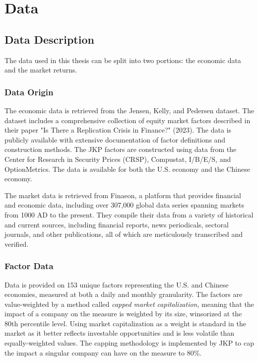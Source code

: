 \chapter{Data}

\section{Data Description}

The data used in this thesis can be split into two portions: the economic data and the market returns.

\subsection{Data Origin}

The economic data is retrieved from the Jensen, Kelly, and Pedersen dataset. The dataset includes a comprehensive collection of equity market factors described in their paper "Is There a Replication Crisis in Finance?" (2023). The data is publicly available with extensive documentation of factor definitions and construction methods. The JKP factors are constructed using data from the Center for Research in Security Prices (CRSP), Compustat, I/B/E/S, and OptionMetrics. The data is available for both the U.S. economy and the Chinese economy.

The market data is retrieved from Finaeon, a platform that provides financial and economic data, including over 307,000 global data series spanning markets from 1000 AD to the present. They compile their data from a variety of historical and current sources, including financial reports, news periodicals, sectoral journals, and other publications, all of which are meticulously transcribed and verified.

\subsection{Factor Data}

Data is provided on 153 unique factors representing the U.S. and Chinese economies, measured at both a daily and monthly granularity. The factors are value-weighted by a method called \textit{capped market capitalization}, meaning that the impact of a company on the measure is weighted by its size, winsorized at the 80th percentile level. Using market capitalization as a weight is standard in the market as it better reflects investable opportunities and is less volatile than equally-weighted values. The capping methodology is implemented by JKP to cap the impact a singular company can have on the measure to 80\%.

